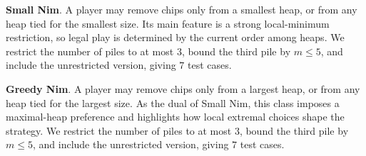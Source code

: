 \documentclass[review]{elsarticle}
\newcommand{\set}[1]{\{ #1 \}}
\newcommand{\tuple}[1]{\langle {#1} \rangle}
\newcommand{\true}{\top}
\newcommand{\statevar}{\mathcal{X}}
\newcommand{\act}{\mathcal{A}}
\newcommand{\constraint}{\mathcal{C}}
\newcommand{\estate}{\mathcal{E}}
\newcommand{\pre}{\mathtt{pre}}
\newcommand{\eff}{\mathtt{eff}}
\begin{document}
{\color{red}\textbf{Small Nim}. A player may remove chips only from a smallest heap, or from any heap tied for the smallest size.}
{\color{red}Its main feature is a strong local-minimum restriction, so legal play is determined by the current order among heaps.}
{\color{red}We restrict the number of piles to at most $3$, bound the third pile by $m \le 5$, and include the unrestricted version, giving $7$ test cases.}

{\color{red}\textbf{Greedy Nim}. A player may remove chips only from a largest heap, or from any heap tied for the largest size.}
{\color{red}As the dual of Small Nim, this class imposes a maximal-heap preference and highlights how local extremal choices shape the strategy.}
{\color{red}We restrict the number of piles to at most $3$, bound the third pile by $m \le 5$, and include the unrestricted version, giving $7$ test cases.}
\end{document}
